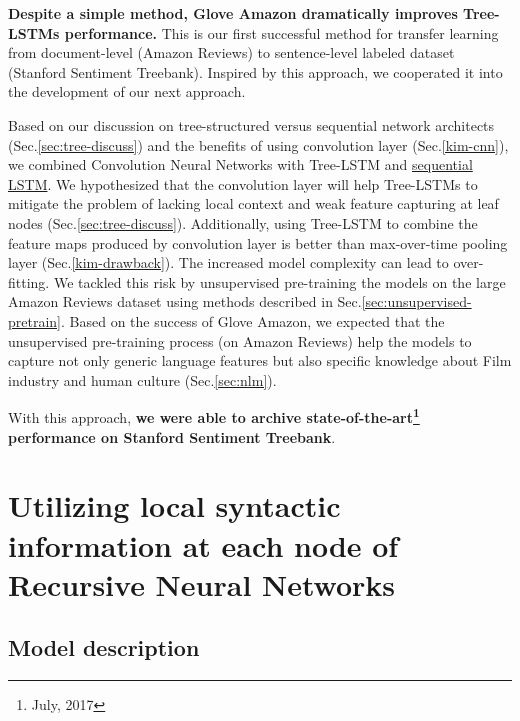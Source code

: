 \begin{description}
\textbf{Despite a simple method, Glove Amazon dramatically improves Tree- LSTMs performance. }
This is our first successful method for transfer learning from document-level (Amazon Reviews) to sentence-level labeled dataset (Stanford Sentiment Treebank).
Inspired by this approach, we cooperated it into the development of our next approach.

\item[\deschyperlink{sec:CNNtree}{Combining Recursive Neural Networks with Convolution Neural Networks}] \label{conv-tree-benefits} Based on our discussion on tree-structured versus sequential network architects (Sec.\ref{sec:tree-discuss}) and the benefits of using convolution layer (Sec.\ref{kim-cnn}), we combined Convolution Neural Networks with Tree-LSTM and \hyperref[sec:lstm]{sequential LSTM}.
We hypothesized that the convolution layer will help Tree-LSTMs to mitigate the problem of lacking local context and weak feature capturing at leaf nodes (Sec.\ref{sec:tree-discuss}).
Additionally, using Tree-LSTM to combine the feature maps produced by convolution layer is better than max-over-time pooling layer (Sec.\ref{kim-drawback}).
The increased model complexity can lead to over-fitting.
We tackled this risk by unsupervised pre-training the models on the large Amazon Reviews dataset using methods described in Sec.\ref{sec:unsupervised-pretrain}.
Based on the success of Glove Amazon, we expected that the unsupervised pre-training process (on Amazon Reviews) help the models to capture not only generic language features but also specific knowledge about Film industry and human culture (Sec.\ref{sec:nlm}).

With this approach, \textbf{we were able to archive state-of-the-art\footnote{July, 2017} performance on Stanford Sentiment Treebank}.
\end{description}


\hypertarget{sec:VTtree}{\section{Utilizing local  syntactic information at each node of Recursive Neural Networks}}\label{sec:VTtree}
\subsection{Model description}

